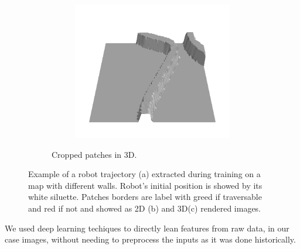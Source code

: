 \documentclass[../document.tex]{subfiles}
\begin{document}
\begin{figure}[H]
\begin{subfigure}[b]{1\textwidth}
\begin{subfigure}[b]{0.19\textwidth}
    \includegraphics[width=\linewidth]{../img/bars1-example-patches/3d/14.png}    
    \end{subfigure}  
\caption{Cropped patches in 3D.}
\end{subfigure}
\caption{Example of a robot trajectory (a) extracted during training on a map with different walls. Robot's initial position is showed by its white siluette. Patches borders are label with greed if traversable and red if not and showed as 2D (b) and 3D(c) rendered images.}
\end{figure}

We used deep learning techiques to directly lean features from raw data, in our case images, without needing to preprocess the inputs as it was done historically.
\end{document}
